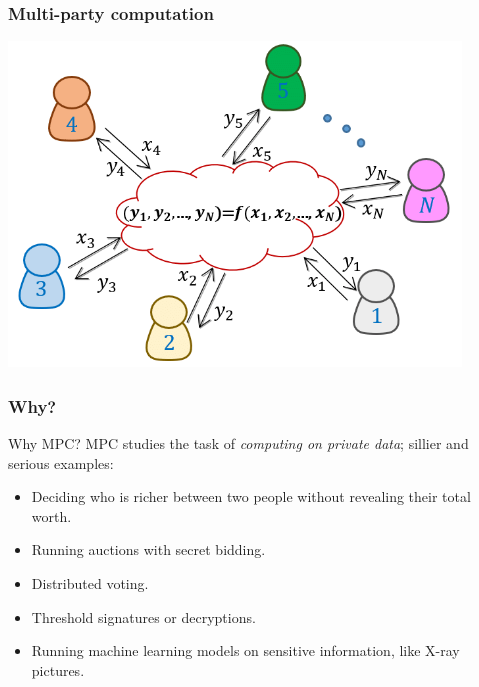 \documentclass{beamer}
\begin{document}
    \begin{frame}
        \frametitle{Multi-party computation}
        
        \centering
        \includegraphics[width=0.9\textwidth]{images/MPC}
    \end{frame}

    \begin{frame}
        \frametitle{Why?}
        \begin{block}{Why MPC?}
            MPC studies the task of \emph{computing on private data}; sillier and serious examples:
            \begin{itemize}
                \item Deciding who is richer between two people without revealing their total worth.
                \item Running auctions with secret bidding.
                \item Distributed voting.
                \item Threshold signatures or decryptions.
                \item Running machine learning models on sensitive information, like X-ray pictures.
            \end{itemize}
        \end{block}
    

    \end{frame}
\end{document}
